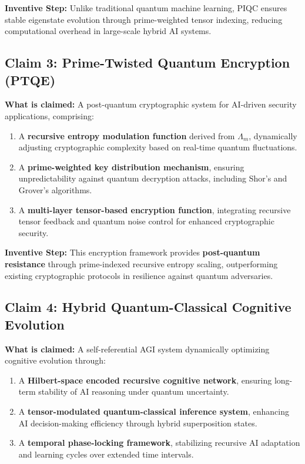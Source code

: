 \documentclass{article}
\theoremstyle{plain}
\begin{document}
\textbf{Inventive Step:} Unlike traditional quantum machine learning, PIQC ensures stable eigenstate evolution through prime-weighted tensor indexing, reducing computational overhead in large-scale hybrid AI systems.

\subsection{Claim 3: Prime-Twisted Quantum Encryption (PTQE)}
\textbf{What is claimed:}  
A post-quantum cryptographic system for AI-driven security applications, comprising:
\begin{enumerate}  
    \item A \textbf{recursive entropy modulation function} derived from $\Lambda_m$, dynamically adjusting cryptographic complexity based on real-time quantum fluctuations.  
    \item A \textbf{prime-weighted key distribution mechanism}, ensuring unpredictability against quantum decryption attacks, including Shor's and Grover’s algorithms.  
    \item A \textbf{multi-layer tensor-based encryption function}, integrating recursive tensor feedback and quantum noise control for enhanced cryptographic security.  
\end{enumerate}

\textbf{Inventive Step:} This encryption framework provides \textbf{post-quantum resistance} through prime-indexed recursive entropy scaling, outperforming existing cryptographic protocols in resilience against quantum adversaries.

\subsection{Claim 4: Hybrid Quantum-Classical Cognitive Evolution}
\textbf{What is claimed:}  
A self-referential AGI system dynamically optimizing cognitive evolution through:
\begin{enumerate}  
    \item A \textbf{Hilbert-space encoded recursive cognitive network}, ensuring long-term stability of AI reasoning under quantum uncertainty.  
    \item A \textbf{tensor-modulated quantum-classical inference system}, enhancing AI decision-making efficiency through hybrid superposition states.  
    \item A \textbf{temporal phase-locking framework}, stabilizing recursive AI adaptation and learning cycles over extended time intervals.  
\end{enumerate}
\end{document}
